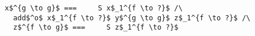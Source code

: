 \begin{figure}[!t]
  \centering
  \begin{minipage}{\columnwidth}
    \begin{lstlisting}[frame=tb]
  x$^{g \to g}$ ===     S x$_1^{f \to ?}$ /\
  add$^o$ x$_1^{f \to ?}$ y$^{g \to g}$ z$_1^{f \to ?}$ /\
  z$^{f \to g}$ ===     S z$_1^{f \to ?}$
    \end{lstlisting}
  \end{minipage}
\end{figure}